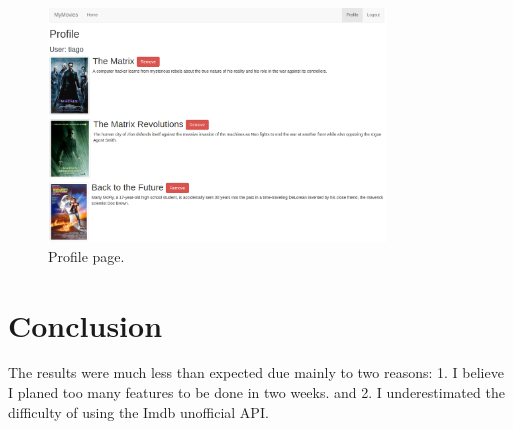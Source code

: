 \begin{figure}[!htb]
\centering
\includegraphics[width=0.8\textwidth]{fig/03-profile.png}
\caption{\label{fig:profile}Profile page.}
\end{figure}

\section{Conclusion}

The results were much less than expected due mainly to two reasons: 1. I
believe I planed too many features to be done in two weeks. and 2. I
underestimated the difficulty of using the Imdb unofficial API.




%
%
%
%
%


